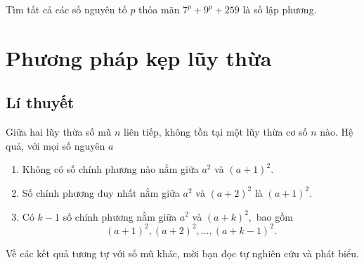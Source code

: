 \begin{gbtt}
Tìm tất cả các số nguyên tố $p$ thỏa mãn $7^p+9^p+259$ là số lập phương.

\end{gbtt}

\section{Phương pháp kẹp lũy thừa}

\subsection*{Lí thuyết}
  Giữa hai lũy thừa số mũ $n$ liên tiếp, không tồn tại một lũy thừa cơ số $n$ nào. Hệ quả, với mọi số nguyên $a$ 
    \begin{enumerate}
        \item Không có số chính phương nào nằm giữa $a^2$ và $\left(a+1\right)^2.$
        \item Số chính phương duy nhất nằm giữa $a^2$ và $\left(a+2\right)^2$ là $\left(a+1\right)^2.$    
        \item Có $k-1$ số chính phương nằm giữa $a^2$ và $\left(a+k\right)^2,$ bao gồm \[\left(a+1\right)^2,\left(a+2\right)^2,\ldots,\left(a+k-1\right)^2.\]  
    \end{enumerate}
    Về các kết quả tương tự với số mũ khác, mời bạn đọc tự nghiên cứu và phát biểu.
